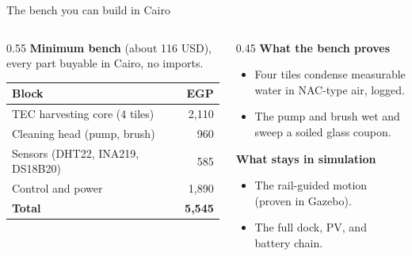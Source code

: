 \documentclass[aspectratio=169,10pt]{beamer}
\begin{document}
\begin{frame}{The bench you can build in Cairo}
  \begin{columns}[T]
    \begin{column}{0.55\textwidth}
      \textbf{Minimum bench} (about \SI{116}{} USD), every part buyable in Cairo, no imports.
      \begin{center}\small
      \begin{tabular}{lr}
        \toprule
        Block & EGP \\
        \midrule
        TEC harvesting core (4 tiles) & 2{,}110 \\
        Cleaning head (pump, brush) & 960 \\
        Sensors (DHT22, INA219, DS18B20) & 585 \\
        Control and power & 1{,}890 \\
        \midrule
        \textbf{Total} & \textbf{5{,}545} \\
        \bottomrule
      \end{tabular}
      \end{center}
    \end{column}
    \begin{column}{0.45\textwidth}
      \textbf{What the bench proves}
      \begin{itemize}\small\setlength\itemsep{0.3em}
        \item Four tiles condense measurable water in NAC-type air, logged.
        \item The pump and brush wet and sweep a soiled glass coupon.
      \end{itemize}
      \vspace{0.4em}
      \textbf{What stays in simulation}
      \begin{itemize}\small\setlength\itemsep{0.3em}
        \item The rail-guided motion (proven in Gazebo).
        \item The full dock, PV, and battery chain.
      \end{itemize}
    \end{column}
  \end{columns}
\end{frame}
\end{document}
